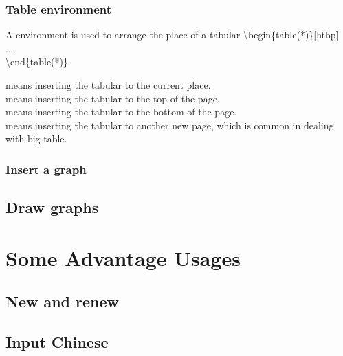 \documentclass{beamer}
\begin{document}
\begin{frame}
	\frametitle{Table environment}
    \begin{definition}
    A  environment is used to arrange the place of a tabular
		{\color{red}\textbackslash begin\{table(*)\}[htbp]}\\
		\quad ...\\
		{\color{red}\textbackslash end\{table(*)\}}\\
	\end{definition}
    \text{[h]} means inserting the tabular to the current place.
    \\\text{[t]} means inserting the tabular to the top of the page.
    \\\text{[b]} means inserting the tabular to the bottom of the page.
    \\\text{[p]} means inserting the tabular to another new page, which is common in dealing with big table.
\end{frame}
\begin{frame}
	\frametitle{Insert a graph}
    
\end{frame}




\subsection{Draw graphs}

\begin{frame}

\end{frame}

\section{Some Advantage Usages}
\begin{frame}
\end{frame}

\subsection{New and renew}

\begin{frame}



\end{frame}

\subsection{Input Chinese}
\end{document}

